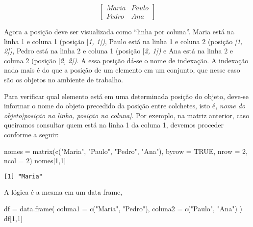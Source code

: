 \documentclass[
  letterpaper,
  DIV=11,
  numbers=noendperiod]{scrreprt}
\newenvironment{Shaded}{\begin{snugshade}}{\end{snugshade}}
\newcommand{\AttributeTok}[1]{\textcolor[rgb]{0.40,0.45,0.13}{#1}}
\newcommand{\ConstantTok}[1]{\textcolor[rgb]{0.56,0.35,0.01}{#1}}
\newcommand{\DecValTok}[1]{\textcolor[rgb]{0.68,0.00,0.00}{#1}}
\newcommand{\FunctionTok}[1]{\textcolor[rgb]{0.28,0.35,0.67}{#1}}
\newcommand{\NormalTok}[1]{\textcolor[rgb]{0.00,0.23,0.31}{#1}}
\newcommand{\OtherTok}[1]{\textcolor[rgb]{0.00,0.23,0.31}{#1}}
\newcommand{\StringTok}[1]{\textcolor[rgb]{0.13,0.47,0.30}{#1}}
\begin{document}
\[\left[\begin{array}{cc}
Maria & Paulo\\ Pedro & Ana \end{array}
\right]
\]

Agora a posição deve ser visualizada como ``linha por coluna''. Maria
está na linha 1 e coluna 1 (posição {[}\emph{1, 1{]})}, Paulo está na
linha 1 e coluna 2 (posição \emph{{[}1, 2{]})}, Pedro está na linha 2 e
coluna 1 (posição {[}\emph{2, 1{]})} e Ana está na linha 2 e coluna 2
(posição {[}\emph{2, 2{]})}. A essa posição dá-se o nome de indexação. A
indexação nada mais é do que a posição de um elemento em um conjunto,
que nesse caso são os objetos no ambiente de trabalho.

Para verificar qual elemento está em uma determinada posição do objeto,
deve-se informar o nome do objeto precedido da posição entre colchetes,
isto é, \emph{nome do objeto{[}posição na linha, posição na coluna{]}}.
Por exemplo, na matriz anterior, caso queiramos consultar quem está na
linha 1 da coluna 1, devemos proceder conforme a seguir:

\begin{Shaded}
\begin{Highlighting}[]
\NormalTok{nomes }\OtherTok{=} \FunctionTok{matrix}\NormalTok{(}\FunctionTok{c}\NormalTok{(}\StringTok{"Maria"}\NormalTok{, }\StringTok{"Paulo"}\NormalTok{, }\StringTok{"Pedro"}\NormalTok{, }\StringTok{"Ana"}\NormalTok{), }\AttributeTok{byrow =} \ConstantTok{TRUE}\NormalTok{, }\AttributeTok{nrow =} \DecValTok{2}\NormalTok{, }\AttributeTok{ncol =} \DecValTok{2}\NormalTok{)}
\NormalTok{nomes[}\DecValTok{1}\NormalTok{,}\DecValTok{1}\NormalTok{]}
\end{Highlighting}
\end{Shaded}

\begin{verbatim}
[1] "Maria"
\end{verbatim}

A lógica é a mesma em um data frame,

\begin{Shaded}
\begin{Highlighting}[]
\NormalTok{df }\OtherTok{=} \FunctionTok{data.frame}\NormalTok{(}
  \AttributeTok{coluna1 =} \FunctionTok{c}\NormalTok{(}\StringTok{"Maria"}\NormalTok{, }\StringTok{"Pedro"}\NormalTok{),}
  \AttributeTok{coluna2 =} \FunctionTok{c}\NormalTok{(}\StringTok{"Paulo"}\NormalTok{, }\StringTok{"Ana"}\NormalTok{)}
\NormalTok{)}
\NormalTok{df[}\DecValTok{1}\NormalTok{,}\DecValTok{1}\NormalTok{]}
\end{Highlighting}
\end{Shaded}
\end{document}
